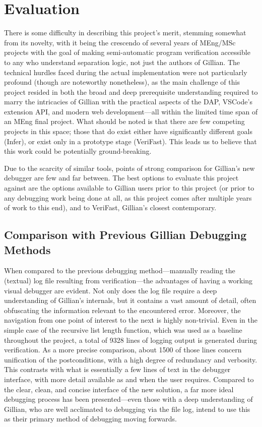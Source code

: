 
\chapter{Evaluation}\label{sec:eval}

There is some difficulty in describing this project's merit, stemming somewhat
from its novelty, with it being the crescendo of several years of MEng/MSc
projects with the goal of making semi-automatic program verification accessible
to any who understand separation logic, not just the authors of Gillian. The
technical hurdles faced during the actual implementation were not particularly
profound (though are noteworthy nonetheless), as the main challenge of this
project resided in both the broad and deep prerequisite understanding required
to marry the intricacies of Gillian with the practical aspects of the DAP,
VSCode's extension API, and modern web development---all within the limited time
span of an MEng final project. What should be noted is that there are few
competing projects in this space; those that do exist either have significantly
different goals (Infer), or exist only in a prototype stage (VeriFast). This
leads us to believe that this work could be potentially ground-breaking.

Due to the scarcity of similar tools, points of strong comparison for Gillian's
new debugger are few and far between. The best options to evaluate this project
against are the options available to Gillian users prior to this project (or
prior to any debugging work being done at all, as this project comes after
multiple years of work to this end), and to VeriFast, Gillian's closest
contemporary.

\section{Comparison with Previous Gillian Debugging Methods}

When compared to the previous debugging method---manually reading the (textual)
log file resulting from verification---the advantages of having a working visual
debugger are evident. Not only does the log file require a deep understanding of
Gillian's internals, but it contains a vast amount of detail, often obfuscating
the information relevant to the encountered error. Moreover, the navigation from
one point of interest to the next is highly non-trivial. Even in the simple case
of the recursive list length function, which was used as a baseline throughout
the project, a total of 9328 lines of logging output is generated during
verification. As a more precise comparison, about 1500 of those lines concern
unification of the postconditions, with a high degree of redundancy and
verbosity. This contrasts with what is essentially a few lines of text in the
debugger interface, with more detail available as and when the user requires.
Compared to the clear, clean, and concise interface of the new solution, a far
more ideal debugging process has been presented---even those with a deep
understanding of Gillian, who are well acclimated to debugging via the file log,
intend to use this as their primary method of debugging moving forwards.

